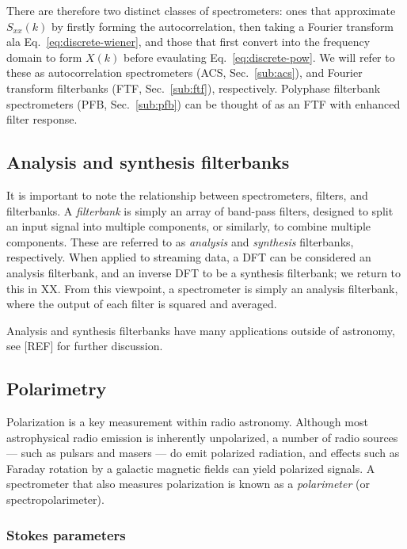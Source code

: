 \documentclass{ws-rv961x669}
\begin{document}
There are therefore two distinct classes of spectrometers: ones that approximate $S_{xx}(k)$ by firstly forming the autocorrelation, then taking a Fourier transform ala Eq.~\ref{eq:discrete-wiener}, and those that first convert into the frequency domain to form $X(k)$ before evaulating Eq.~\ref{eq:discrete-pow}. We will refer to these as autocorrelation spectrometers (ACS, Sec.~\ref{sub:acs}), and Fourier transform filterbanks (FTF, Sec.~\ref{sub:ftf}), respectively. Polyphase filterbank spectrometers (PFB, Sec.~\ref{sub:pfb}) can be thought of as an  FTF with enhanced filter response.

\subsection{Analysis and synthesis filterbanks}

It is important to note the relationship between spectrometers, filters, and filterbanks. A \emph{filterbank} is simply an array of band-pass filters, designed to split an input signal into multiple components, or similarly, to combine multiple components. These are referred to as \emph{analysis} and \emph{synthesis} filterbanks, respectively. When applied to streaming data, a DFT can be considered an analysis filterbank, and an inverse DFT to be a synthesis filterbank; we return to this in XX. From this viewpoint, a spectrometer is simply an analysis filterbank, where the output of each filter is squared and averaged.

Analysis and synthesis filterbanks have many applications outside of astronomy, see [REF] for further discussion.

\subsection{Polarimetry}

Polarization is a key measurement within radio astronomy.\citet{BookTinbergenPolarim}  Although most astrophysical radio emission is inherently unpolarized, a number of radio sources --- such as pulsars and masers --- do emit polarized radiation, and effects such as Faraday rotation by a galactic magnetic fields can yield polarized signals. A spectrometer that also measures polarization is known as a \emph{polarimeter} (or spectropolarimeter).

\subsubsection{Stokes parameters}
\end{document}
